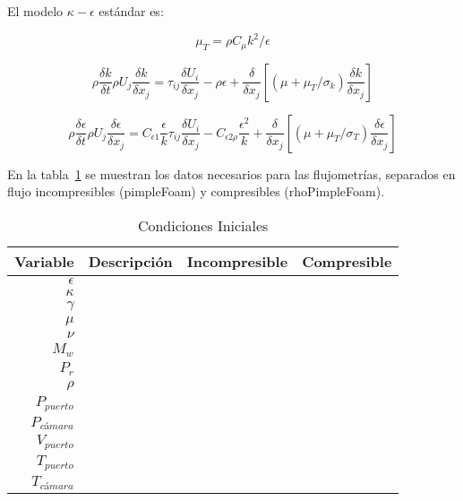 El modelo $\kappa-\epsilon$ estándar es:

\begin{equation}
  \mu_{T}=\rho C_{\mu}k^{2}/\epsilon
\end{equation}

\begin{equation}
  \rho\frac{\delta k}{\delta t}
  \rho U_{j}\frac{\delta k}{\delta x_{j}}
  =
  \tau_{ij} \frac{\delta U_{i}}{\delta x_{j}}
  -
  \rho\epsilon
  +
  \frac{\delta}{\delta x_{j}}\left[
    (\mu + \mu_{T}/\sigma_{k})\frac{\delta k}{\delta x_{j}}
  \right]
\end{equation}

\begin{equation}
  \rho\frac{\delta \epsilon}{\delta t}
  \rho U_{j}\frac{\delta \epsilon}{\delta x_{j}}
  =
  C_{\epsilon 1}\frac{\epsilon}{k} \tau_{ij}\frac{\delta U_{i}}{\delta x_{j}}
  -
  C_{\epsilon 2 \rho}
  \frac{\epsilon^{2}}{k}
  +
  \frac{\delta}{\delta x_{j}}\left[
    (\mu + \mu_{T}/\sigma_{T})\frac{\delta \epsilon}{\delta x_{j}}
  \right]
\end{equation}


En la tabla~\ref{tab:condiciones_iniciales} se muestran los datos necesarios
para las flujometrías, separados en flujo incompresibles (pimpleFoam) y
compresibles (rhoPimpleFoam).

\begin{table}
\centering
    \begin{tabular}{rccc} \toprule
      Variable      & Descripción   & Incompresible & Compresible \\ \midrule
      $\epsilon$    &               &               & \\
      $\kappa$      &               &               & \\
      $\gamma$      &               &               & \\
      $\mu$         &               &               & \\
      $\nu$         &               &               & \\
      $M_{w}$       &               &               & \\
      $P_{r}$       &               &               & \\
      $\rho$        &               &               & \\
      $P_{puerto}$  &               &               & \\
      $P_{cámara}$  &               &               & \\
      $V_{puerto}$  &               &               & \\
      $T_{puerto}$  &               &               & \\
      $T_{cámara}$  &               &               & \\ \bottomrule
    \end{tabular}
    \caption{Condiciones Iniciales}\label{tab:condiciones_iniciales}
\end{table}

